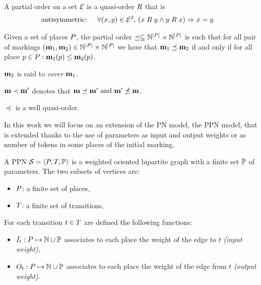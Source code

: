 \begin{defi}
  A partial order on a set $\mathcal{E}$ is a quasi-order $\mathrel{R}$ that is
  \begin{align*}
    \text{antisymmetric: } &&\forall (x, y) \in \mathcal{E}^2,\ & (x \mathrel{R} y\land y \mathrel{R} x)\Rightarrow x = y
  \end{align*}
\end{defi}

\begin{defi}
  Given a set of places $P$, the partial order \(\preceq \subseteq \mathbb{N}^{\left|P\right|} \times \mathbb{N}^{\left|P\right|}\) is such that for all pair of markings \((\mathbf{m}_1, \mathbf{m}_2) \in \mathbb{N}^{\left|P\right|} \times \mathbb{N}^{\left|P\right|}\) we have that \(\mathbf{m}_1 \preceq \mathbf{m}_2\) if and only if for all place \(p \in P : \mathbf{m}_1(p) \leq \mathbf{m}_2(p)\).

  $\mathbf{m}_2$ is said to \emph{cover} $\mathbf{m}_1$.
\end{defi}

\(\mathbf{m} \prec \mathbf{m'}\) denotes that \(\mathbf{m} \preceq \mathbf{m'} \text{ and } \mathbf{m'} \npreceq \mathbf{m}\).

\begin{lemm}
  \label{lemm:wqo}
  $\preceq$ is a well quasi-order.
\end{lemm}

In this work we will focus on an extension of the \ac{PN} model, the \ac{PPN} model, that is extended thanks to the use of parameters as input and output weights or as number of tokens in some places of the initial marking.

\begin{defi}
  A \acf{PPN} $\mathcal{S}_{} = \left\langle P_{}, T_{}, \mathbb{P}_{}\right\rangle$ is a weighted oriented bipartite graph with a finite set $\mathbb{P}$ of parameters. The two subsets of vertices are:
  \begin{itemize}
    \item $P$: a finite set of places,
    \item $T$: a finite set of transitions,
  \end{itemize}
  For each transition $t \in T$ are defined the following functions:
  \begin{itemize}
    \item $\inw[t] : P \mapsto \naturals \cup \parameters$ associates to each place the weight of the edge to $t$ \emph{(input weight)},
    \item $\outw[t] : P \mapsto \naturals \cup \parameters$ associates to each place the weight of the edge from $t$ \emph{(output weight)}.
  \end{itemize}
\end{defi}

